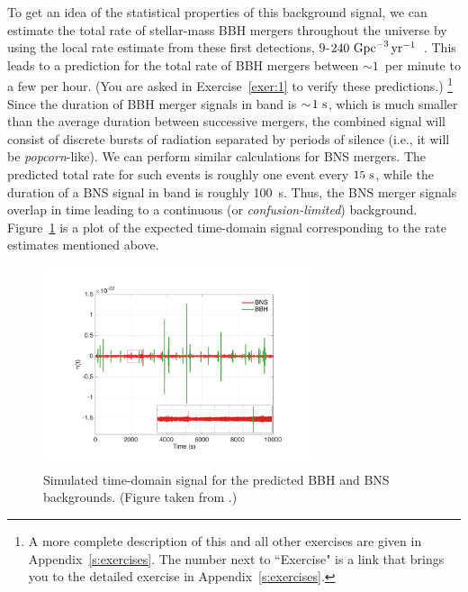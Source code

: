 To get an idea of the statistical properties of this
background signal, we can estimate the total rate of 
stellar-mass BBH mergers throughout the universe by
using the local rate estimate from these first detections,
$9$-$240~{\rm Gpc}^{-3}\,{\rm yr}^{-1}$~\cite{TheLIGOScientific:2016-O1-rates}.
This leads to a prediction for the total rate of 
BBH mergers between $\sim\!1$~per minute to a few per hour.
(You are asked in Exercise~\ref{exer:1} to verify
these predictions.)%
\footnote{A more complete description of this and 
all other exercises are given in 
Appendix~\ref{s:exercises}.
The number next to ``Exercise" is a link that brings 
you to the detailed exercise in Appendix~\ref{s:exercises}.}
Since the duration of BBH merger signals in band 
is $\sim\!1~{\rm s}$, which is much smaller than the 
average duration between successive mergers, the 
combined signal will consist of discrete bursts of 
radiation separated by periods of silence 
(i.e., it will be {\em popcorn}-like).
We can perform similar calculations for BNS mergers.
The predicted total rate for such events is roughly 
one event every $15~{\rm s}$, while the duration of 
a BNS signal in band is roughly 100~{\rm s}. 
Thus, the BNS merger signals overlap in time leading to 
a continuous (or {\em confusion-limited}) background. 
Figure~\ref{f:BBH-BNS-timeseries} is a plot of the
expected time-domain signal corresponding to the rate
estimates mentioned above.
%
\begin{figure}[htbp!]
\begin{center}
\includegraphics[width=0.7\textwidth]{Figures/BBH-BNS-timeseries}
\caption{Simulated time-domain signal for the predicted BBH and 
BNS backgrounds.  
(Figure taken from \cite{StochImplications:2018}.)}
\label{f:BBH-BNS-timeseries}
\end{center}
\end{figure}
%

